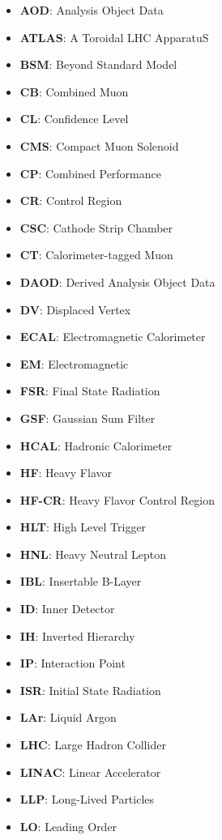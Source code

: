 \begin{itemize}
    \item \textbf{AOD}: Analysis Object Data
    \item \textbf{ATLAS}: A Toroidal LHC ApparatuS
    \item \textbf{BSM}: Beyond Standard Model
    \item \textbf{CB}: Combined Muon
    \item \textbf{CL}: Confidence Level
    \item \textbf{CMS}: Compact Muon Solenoid
    \item \textbf{CP}: Combined Performance
    \item \textbf{CR}: Control Region
    \item \textbf{CSC}: Cathode Strip Chamber
    \item \textbf{CT}: Calorimeter-tagged Muon
    \item \textbf{DAOD}: Derived Analysis Object Data
    \item \textbf{DV}: Displaced Vertex
    \item \textbf{ECAL}: Electromagnetic Calorimeter
    \item \textbf{EM}: Electromagnetic
    \item \textbf{FSR}: Final State Radiation
    \item \textbf{GSF}: Gaussian Sum Filter
    \item \textbf{HCAL}: Hadronic Calorimeter
    \item \textbf{HF}: Heavy Flavor
    \item \textbf{HF-CR}: Heavy Flavor Control Region
    \item \textbf{HLT}: High Level Trigger
    \item \textbf{HNL}: Heavy Neutral Lepton
    \item \textbf{IBL}: Insertable B-Layer
    \item \textbf{ID}: Inner Detector
    \item \textbf{IH}: Inverted Hierarchy
    \item \textbf{IP}: Interaction Point
    \item \textbf{ISR}: Initial State Radiation
    \item \textbf{LAr}: Liquid Argon
    \item \textbf{LHC}: Large Hadron Collider
    \item \textbf{LINAC}: Linear Accelerator
    \item \textbf{LLP}: Long-Lived Particles
    \item \textbf{LO}: Leading Order

\end{itemize}
